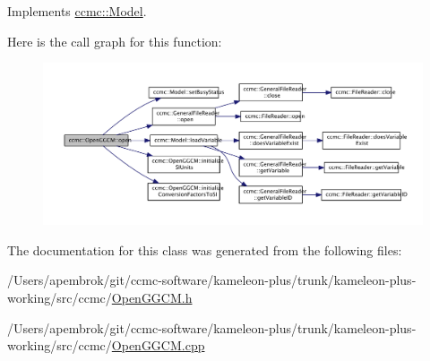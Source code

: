 Implements \hyperlink{classccmc_1_1_model_a3c64dc635c2c1a2fe2f8efa2a3666282}{ccmc\-::\-Model}.



Here is the call graph for this function\-:\nopagebreak
\begin{figure}[H]
\begin{center}
\leavevmode
\includegraphics[width=350pt]{classccmc_1_1_open_g_g_c_m_a899907309758135dbabc0d3c7b465900_cgraph}
\end{center}
\end{figure}




The documentation for this class was generated from the following files\-:\begin{DoxyCompactItemize}
\item 
/\-Users/apembrok/git/ccmc-\/software/kameleon-\/plus/trunk/kameleon-\/plus-\/working/src/ccmc/\hyperlink{_open_g_g_c_m_8h}{Open\-G\-G\-C\-M.\-h}\item 
/\-Users/apembrok/git/ccmc-\/software/kameleon-\/plus/trunk/kameleon-\/plus-\/working/src/ccmc/\hyperlink{_open_g_g_c_m_8cpp}{Open\-G\-G\-C\-M.\-cpp}\end{DoxyCompactItemize}
